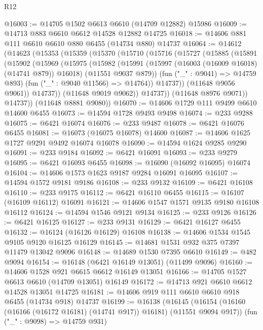 \begin{lexlean}{R12}
\begin{coremodule}
{{{{{{{{{{{{{{{{{{{{{{{{{{{{{{{{{{{{{{{{{{{{{{{{{{{{{{{{{{{{{{{{{{{{{{{{{{{{{{{{{{@16003 := @14705 @1502 @6613 @6610 (@14709 @12882) @15986
@16009 := @14713 @883 @6610 @6612 @14528 @12882 @14725
@16018 := @14606 @881 @111 @6610 @6610 @880 @6455 (@14734 @880) @14737
@16064 := @14612
    (@14623
      (@15353
        (@15359
          (@15370
            (@15710
              (@15716
                (@15727
                  (@15885
                    (@15891
                      (@15902
                        (@15969
                          (@15975
                            (@15982
                              (@15991
                                (@15997 (@16003 (@16009 @16018) (@14741 @879)) @16018)
                                (@11551 @9037 @879))
                              (fun ("_" : @9041) => @14759 @893)
                              (fun ("_" : @9040 @11566) => @14764))
                            @14737))
                        (@11648 @9056 @9061))
                      @14737))
                  (@11648 @9019 @9062))
                @14737))
            (@11648 @8976 @9071))
          @14737))
      (@11648 @8881 @9080))
@16070 := @14606 @1729 @111 @9499 @6610 @14600 @6455
@16073 := @14594 @1728 @9493 @9498
@16074 := @233 @9288
@16075 := @6421 @16074
@16076 := @233 @9487
@16078 := @6421 @16076 @6455
@16081 := @16073 (@16075 @16078) @14600
@16087 := @14606 @1625 @1727 @9291 @9492 @16074 @16078
@16090 := @14594 @1624 @9285 @9290
@16091 := @233 @9184
@16092 := @6421 @16091
@16093 := @233 @9279
@16095 := @6421 @16093 @6455
@16098 := @16090 (@16092 @16095) @16074
@16104 := @14606 @1573 @1623 @9187 @9284 @16091 @16095
@16107 := @14594 @1572 @9181 @9186
@16108 := @233 @9132
@16109 := @6421 @16108
@16110 := @233 @9175
@16112 := @6421 @16110 @6455
@16115 := @16107 (@16109 @16112) @16091
@16121 := @14606 @1547 @1571 @9135 @9180 @16108 @16112
@16124 := @14594 @1546 @9121 @9134
@16125 := @233 @9126
@16126 := @6421 @16125
@16127 := @233 @9131
@16129 := @6421 @16127 @6455
@16132 := @16124 (@16126 @16129) @16108
@16138 := @14606 @1534 @1545 @9105 @9120 @16125 @16129
@16145 := @14681 @1531 @932 @375 @7397 @11479 @13042 @9096
@16148 := @14689 @1530 @7395 @6610
@16149 := @482 @9094
@16154 := @16148 (@6421 @16149 @13051) (@11499 @9096)
@16160 := @14606 @1528 @921 @6615 @6612 @16149 @13051
@16166 := @14705 @1527 @6613 @6610 (@14709 @13051) @16149
@16172 := @14713 @921 @6610 @6612 @14528 @13051 @14725
@16181 := @14606 @919 @111 @6610 @6610 @918 @6455 (@14734 @918) @14737
@16199 := @16138
    (@16145
      (@16154 (@16160 (@16166 (@16172 @16181) (@14741 @917)) @16181) (@11551 @9094 @917))
      (fun ("_" : @9098) => @14759 @931)
}}}}}}}}}}}}}}}}}}}}}}}}}}}}}}}}}}}}}}}}}}}}}}}}}}}}}}}}}}}}}}}}}}}}}}}}}}}}}}}}}}
\end{coremodule}
\end{lexlean}
